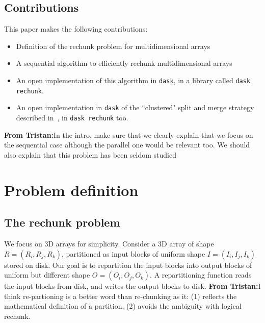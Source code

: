 \documentclass[conference]{IEEEtran}
\newcommand{\tristan}[1]{\color{orange}\textbf{From Tristan:}#1\color{black}}
\begin{document}
\subsection{Contributions}
This paper makes the following contributions:
\begin{itemize}
  \item Definition of the rechunk problem for multidimensional arrays
  \item A sequential algorithm to efficiently rechunk multidimensional arrays
  \item An open implementation of this algorithm in \texttt{dask},
  in a library called \texttt{dask rechunk}.
  \item An open implementation in \texttt{dask} of the ``clustered" split and
  merge strategy described in~\cite{seqalgorithms}, in \texttt{dask rechunk} too.
\end{itemize}

\tristan{In the intro, make sure that we clearly explain that we focus on the sequential case although the parallel one would be relevant too.
We should also explain that this problem has been seldom studied}

\section{Problem definition}
\subsection{The rechunk problem}
We focus on 3D arrays for simplicity. Consider a 3D array of shape $R =
(R_i, R_j, R_k)$, partitioned as input blocks of uniform shape $I = (I_i,
I_j, I_k)$ stored on disk. Our goal is to repartition the input blocks into output blocks
of uniform but different shape $O = (O_i, O_j, O_k)$. A repartitioning function reads the input blocks from
disk, and writes the output blocks to disk. \tristan{I think
re-partioning is a better word than re-chunking as it: (1) reflects the
mathematical definition of a partition, (2) avoids the ambiguity with logical rechunk.}
\end{document}
